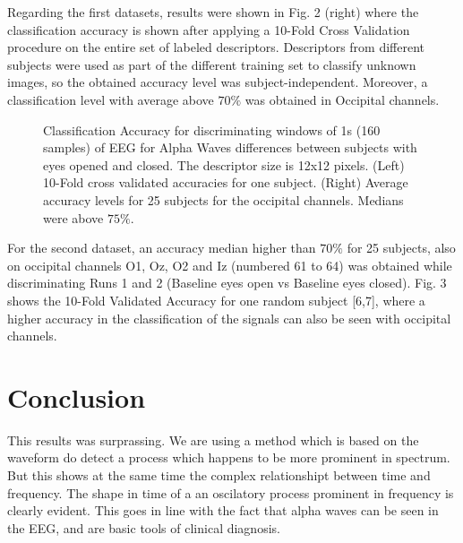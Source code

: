 Regarding the first datasets, results were shown in Fig. 2 (right) where the classification accuracy is shown after applying a 10-Fold Cross Validation procedure on the entire set of labeled descriptors.  Descriptors from different subjects were used as part of the different training set to classify unknown images, so the obtained accuracy level was subject-independent.  Moreover, a classification level with average above $70\%$ was obtained in Occipital channels.


  \begin{figure}[thpb]
      \centering
      \setlength\fboxsep{0pt}
	  \setlength\fboxrule{0.5pt}
      \caption[Classification Accuracy of Alpha Waves]{Classification Accuracy for discriminating windows of 1s (160 samples) of EEG for Alpha Waves differences between subjects with eyes opened and closed. The descriptor size is 12x12 pixels. (Left) 10-Fold cross validated accuracies for one subject.  (Right) Average accuracy levels for 25 subjects for the occipital channels. Medians were above $75\%$.}
      \label{figure1}
   \end{figure}   

For the second dataset, an accuracy median higher than $70\%$ for 25 subjects, also on occipital channels O1, Oz, O2 and Iz (numbered 61 to 64) was obtained while discriminating Runs 1 and 2 (Baseline eyes open vs Baseline eyes closed). Fig. 3 shows the 10-Fold Validated Accuracy for one random subject [6,7], where a higher accuracy in the classification of the signals can also be seen with occipital channels.  

\section{Conclusion}

This results was surprassing.  We are using a method which is based on the waveform do detect a process which happens to be more prominent in spectrum.  But this shows at the same time the complex relationshipt between time and frequency.  The shape in time of a an oscilatory process prominent in frequency is clearly evident.  This goes in line with the fact that alpha waves can be seen in the EEG, and are basic tools of clinical diagnosis.